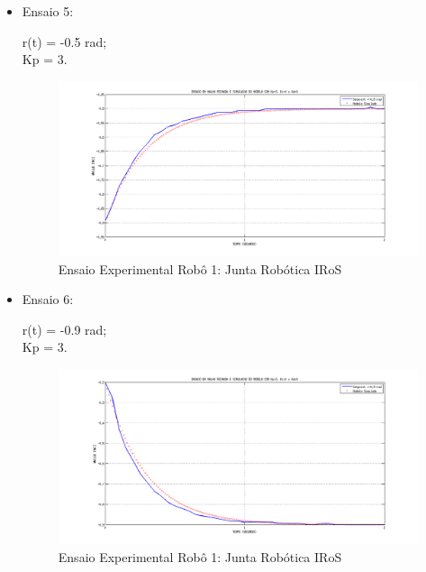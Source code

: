 \documentclass[12pt,oneside,a4paper, chapter=TITLE, section = TITLE, english, brazil]{abntex2}
\begin{document}
\begin{itemize}
\item Ensaio 5:
 
r(t) = -0.5 rad;\\
Kp = 3.\\

\begin{figure}[h] %
\centering
\includegraphics[scale=0.43]{./imagens/Simu3_1_robo}
\caption[Ensaio Experimental Robô 1: Junta Robótica IRoS]{Ensaio Experimental Robô 1: Junta Robótica IRoS}
\label{fig:simu3_1_robo}
\end{figure}


\item Ensaio 6:
 
r(t) = -0.9 rad;\\
Kp = 3.\\

\begin{figure}[h] %
\centering
\includegraphics[scale=0.42]{./imagens/Simu3_2_robo}
\caption[Ensaio Experimental Robô 1: Junta Robótica IRoS]{Ensaio Experimental Robô 1: Junta Robótica IRoS}
\label{fig:simu3_2_robo}
\end{figure}



\end{itemize}
\end{document}
